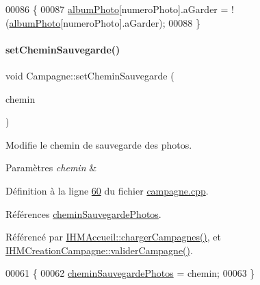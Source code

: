 \begin{DoxyCode}
00086 \{
00087     \hyperlink{class_campagne_a4d1fc7d4dbf10868a297fe3df7f08dbf}{albumPhoto}[numeroPhoto].aGarder = !(\hyperlink{class_campagne_a4d1fc7d4dbf10868a297fe3df7f08dbf}{albumPhoto}[numeroPhoto].aGarder);
00088 \}
\end{DoxyCode}
\mbox{\label{class_campagne_a68c7eb6776e46306b10f1ca2a409ae6e}} 
\paragraph{\texorpdfstring{set\+Chemin\+Sauvegarde()}{setCheminSauvegarde()}}
{\footnotesize\ttfamily void Campagne\+::set\+Chemin\+Sauvegarde (\begin{DoxyParamCaption}\item[{Q\+String}]{chemin }\end{DoxyParamCaption})}



Modifie le chemin de sauvegarde des photos. 


\begin{DoxyParams}{Paramètres}
{\em chemin} & \\
\hline
\end{DoxyParams}


Définition à la ligne \hyperlink{campagne_8cpp_source_l00060}{60} du fichier \hyperlink{campagne_8cpp_source}{campagne.\+cpp}.



Références \hyperlink{campagne_8h_source_l00043}{chemin\+Sauvegarde\+Photos}.



Référencé par \hyperlink{ihmaccueil_8cpp_source_l00130}{I\+H\+M\+Accueil\+::charger\+Campagnes()}, et \hyperlink{ihmcreationcampagne_8cpp_source_l00071}{I\+H\+M\+Creation\+Campagne\+::valider\+Campagne()}.


\begin{DoxyCode}
00061 \{
00062     \hyperlink{class_campagne_a95484d0782021bc30157669d16c42208}{cheminSauvegardePhotos} = chemin;
00063 \}
\end{DoxyCode}
\mbox{\label{class_campagne_aff9aebbc64c40ce2c1b5ae584c7a8d71}} 
